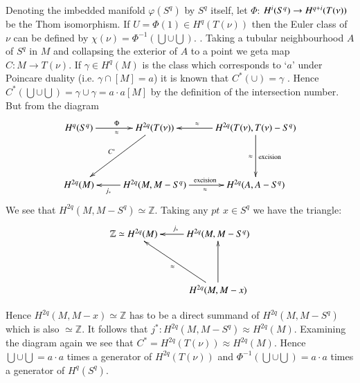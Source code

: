 Denoting the imbedded manifold $\varphi (S^q)$ by $S^q$ itself, let
$\Phi$: $H^i\break (S^q) \to H^{q+i} (T(\nu))$ be the Thom isomorphism. If
$U= \Phi (1) \in H^q (T(\nu))$ then the Euler class of $\nu$ can
be defined by $\chi (\nu) = \Phi^{-1} (\bigcup \cup \bigcup
)$. \cite{c1:key5}. Taking a tubular neighbourhood $A$ of $S^q$ in $M$ and
collapsing the exterior of $A$ to a point we get\pageoriginale a map
$C: M \to T(\nu)$. If $\gamma \in H^q (M)$ is the class which corresponds
to `$a$' under Poincare duality (i.e. $\gamma \cap [M] = a$) it is
known that $C^* (\cup) = \gamma$ \cite{c1:key9}. Hence $C^* (\bigcup \cup
\bigcup) = \gamma \cup \gamma =a\cdot a[M]$ by the definition of the
intersection number. But from the diagram 
\[
\xymatrix@R=1.5cm{
H^q (S^q) \ar[r]^{\Phi}_{\approx} & H^{2q} (T (\nu)) \ar[dl]_{C^*} &
H^{2q} (T(\nu), T(\nu) - S^q) \ar[d]^{\rm excision}_{\approx}
\ar[l]_>>>>>>>>{\approx}\\ 
H^{2q}(M) & H^{2q} (M,M-S^q) \ar[r]^{\rm excision}_{\approx}
\ar[l]^>>>>>{j_*}  & H^{2q} (A, A-S^q)
}
\]
We see that $H^{2q} (M, M-S^q) \simeq \mathbb{Z}$. Taking any $pt$ $x
\in S^q$ we have the triangle: 
\[
\xymatrix@R=1.5cm{
\mathbb{Z} \simeq H^{2q} (M) & H^{2q} (M, M-S^q)\ar[l]_{j_*} \\
& H^{2q} (M,M-x) \ar[u] \ar[ul]^{\approx}
}
\]

Hence $H^{2q}(M, M-x) \simeq \mathbb{Z}$ has to be a direct summand of
$H^{2q} (M, M-S^q)$ which is also $\simeq \mathbb{Z}$. It follows that
$j^*: H^{2q} (M, M-S^q) \approx H^{2q}(M)$. Examining the diagram
again we see that $C^* = H^{2q} (T(\nu)) \approx H^{2q}(M)$. Hence
$\bigcup \cup \bigcup =a \cdot a$ times a generator of $H^{2q} (T(\nu))$
and $\Phi^{-1} (\bigcup \cup \bigcup) = a \cdot a$ times a generator of
$H^q (S^q)$. 


